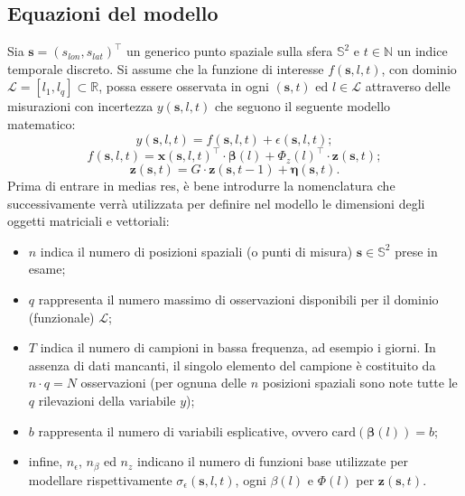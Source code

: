\subsection[Equazioni del modello]{Equazioni del modello}
\label{equazioni_modello_base}
Sia $\mathbf{s} = (s_{lon}, s_{lat})^\top$ un generico punto spaziale sulla sfera $\mathbb{S}^2$ e $t\in\mathbb{N}$ un indice temporale discreto. Si assume che la funzione di interesse $f(\mathbf{s}, l, t)$, con dominio $\mathcal{L}=[l_1, l_q]\subset\mathbb{R}$, possa essere osservata in ogni $(\mathbf{s}, t)$ ed $l\in \mathcal{L}$ attraverso delle misurazioni con incertezza $y(\mathbf{s}, l, t)$ che seguono il seguente modello matematico:
\begin{equation}
	y(\mathbf{s}, l, t) = f(\mathbf{s}, l, t) + \epsilon(\mathbf{s}, l, t);
	\label{eq_rumore_uscita}
\end{equation}
\begin{equation}
	f(\mathbf{s}, l, t) = \mathbf{x}(\mathbf{s}, l, t)^\top\cdot\boldsymbol{\beta}(l) + \Phi_z(l)^\top\cdot\mathbf{z}(\mathbf{s}, t);
	\label{eq_comp_det}
\end{equation}
\begin{equation}
	\mathbf{z}(\mathbf{s}, t) = G\cdot \mathbf{z}(\mathbf{s}, t-1) + \boldsymbol{\eta}(\mathbf{s}, t).
	\label{eq_comp_lat}
\end{equation}
Prima di entrare in medias res, è bene introdurre la nomenclatura che successivamente verrà utilizzata per definire nel modello le dimensioni degli oggetti matriciali e vettoriali:
\begin{itemize}
	\item $n$ indica il numero di posizioni spaziali (o punti di misura) $\mathbf{s}\in\mathbb{S}^2$ prese in esame;
	\item $q$ rappresenta il numero massimo di osservazioni disponibili per il dominio (funzionale) $\mathcal{L}$;
	\item $T$ indica il numero di campioni in bassa frequenza, ad esempio i giorni. In assenza di dati mancanti, il singolo elemento del campione è costituito da $n\cdot q = N$ osservazioni (per ognuna delle $n$ posizioni spaziali sono note tutte le $q$ rilevazioni della variabile $y$);
	\item $b$ rappresenta il numero di variabili esplicative, ovvero $\text{card}(\boldsymbol{\beta}(l)) = b$;
	\item infine, $n_\epsilon$, $n_\beta$ ed $n_z$ indicano il numero di funzioni base utilizzate per modellare rispettivamente $\sigma_\epsilon (\mathbf{s}, l, t)$, ogni $\beta(l)$ e $\Phi(l)$ per $\mathbf{z}(\mathbf{s}, t)$.
\end{itemize}

